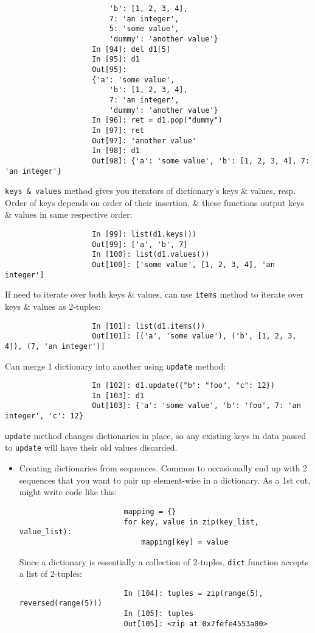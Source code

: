 \documentclass{article}
\begin{document}
\begin{enumerate}
\begin{itemize}
\begin{itemize}
\begin{itemize}
\begin{verbatim}
						'b': [1, 2, 3, 4],
						7: 'an integer',
						5: 'some value',
						'dummy': 'another value'}
					In [94]: del d1[5]
					In [95]: d1
					Out[95]:
					{'a': 'some value',
						'b': [1, 2, 3, 4],
						7: 'an integer',
						'dummy': 'another value'}
					In [96]: ret = d1.pop("dummy")
					In [97]: ret
					Out[97]: 'another value'
					In [98]: d1
					Out[98]: {'a': 'some value', 'b': [1, 2, 3, 4], 7: 'an integer'}
				\end{verbatim}
				{\tt keys \& values} method gives you iterators of dictionary's keys \& values, resp. Order of keys depends on order of their insertion, \& these functions output keys \& values in same respective order:
				\begin{verbatim}
					In [99]: list(d1.keys())
					Out[99]: ['a', 'b', 7]
					In [100]: list(d1.values())
					Out[100]: ['some value', [1, 2, 3, 4], 'an integer']
				\end{verbatim}
				If need to iterate over both keys \& values, can use {\tt items} method to iterate over keys \& values as 2-tuples:
				\begin{verbatim}
					In [101]: list(d1.items())
					Out[101]: [('a', 'some value'), ('b', [1, 2, 3, 4]), (7, 'an integer')]
				\end{verbatim}
				Can merge 1 dictionary into another using {\tt update} method:
				\begin{verbatim}
					In [102]: d1.update({"b": "foo", "c": 12})
					In [103]: d1
					Out[103]: {'a': 'some value', 'b': 'foo', 7: 'an integer', 'c': 12}
				\end{verbatim}
				{\tt update} method changes dictionaries in place, so any existing keys in data passed to {\tt update} will have their old values discarded.
				\begin{itemize}
					\item {\sf Creating dictionaries from sequences.} Common to occasionally end up with 2 sequences that you want to pair up element-wise in a dictionary. As a 1st cut, might write code like this:
					\begin{verbatim}
						mapping = {}
						for key, value in zip(key_list, value_list):
						    mapping[key] = value
					\end{verbatim}
					Since a dictionary is essentially a collection of 2-tuples, {\tt dict} function accepts a list of 2-tuples:
					\begin{verbatim}
						In [104]: tuples = zip(range(5), reversed(range(5)))
						In [105]: tuples
						Out[105]: <zip at 0x7fefe4553a00>

\end{verbatim}
\end{itemize}
\end{itemize}
\end{itemize}
\end{itemize}
\end{enumerate}
\end{document}
